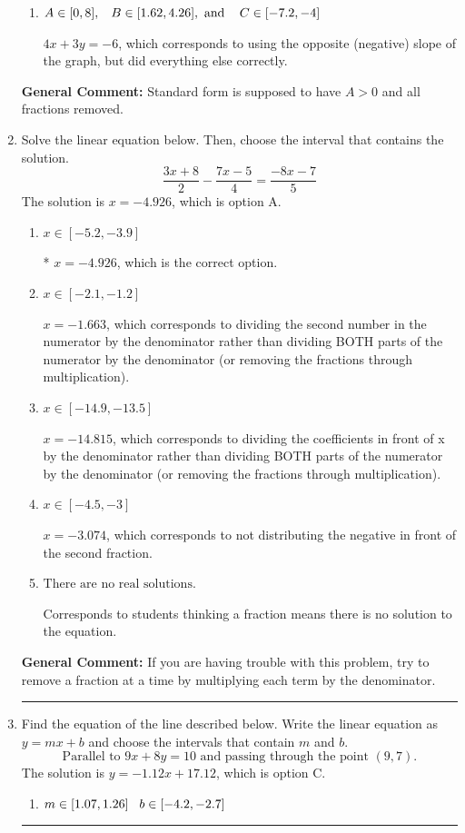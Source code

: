 \documentclass{extbook}[14pt]
\newcommand{\litem}[1]{\item #1

\rule{\textwidth}{0.4pt}}
\begin{document}
\begin{enumerate}
{\begin{enumerate}[label=\Alph*.]
* $4x - 3y = 6$, which is the correct option.
\item \( A \in [0, 8], \hspace{3mm} B \in [1.62, 4.26], \text{ and } \hspace{3mm} C \in [-7.2, -4] \)

 $4x + 3y = -6$, which corresponds to using the opposite (negative) slope of the graph, but did everything else correctly.
\end{enumerate}

\textbf{General Comment:} Standard form is supposed to have $A > 0$ and all fractions removed.
}
\litem{
Solve the linear equation below. Then, choose the interval that contains the solution.
\[ \frac{3x + 8}{2} - \frac{7x -5}{4} = \frac{-8x -7}{5} \]
The solution is \( x = -4.926 \), which is option A.\begin{enumerate}[label=\Alph*.]
\item \( x \in [-5.2, -3.9] \)

* $x = -4.926$, which is the correct option.
\item \( x \in [-2.1, -1.2] \)

 $x = -1.663$, which corresponds to dividing the second number in the numerator by the denominator rather than dividing BOTH parts of the numerator by the denominator (or removing the fractions through multiplication).
\item \( x \in [-14.9, -13.5] \)

 $x = -14.815$, which corresponds to dividing the coefficients in front of x by the denominator rather than dividing BOTH parts of the numerator by the denominator (or removing the fractions through multiplication).
\item \( x \in [-4.5, -3] \)

 $x = -3.074$, which corresponds to not distributing the negative in front of the second fraction.
\item \( \text{There are no real solutions.} \)

Corresponds to students thinking a fraction means there is no solution to the equation.
\end{enumerate}

\textbf{General Comment:} If you are having trouble with this problem, try to remove a fraction at a time by multiplying each term by the denominator.
}
\litem{
Find the equation of the line described below. Write the linear equation as $ y=mx+b $ and choose the intervals that contain $m$ and $b$.
\[ \text{Parallel to } 9 x + 8 y = 10 \text{ and passing through the point } (9, 7). \]
The solution is \( y = -1.12x + 17.12 \), which is option C.\begin{enumerate}[label=\Alph*.]
\item \( m \in [1.07, 1.26] \hspace*{3mm} b \in [-4.2, -2.7] \)


\end{enumerate}}
\end{enumerate}
\end{document}
